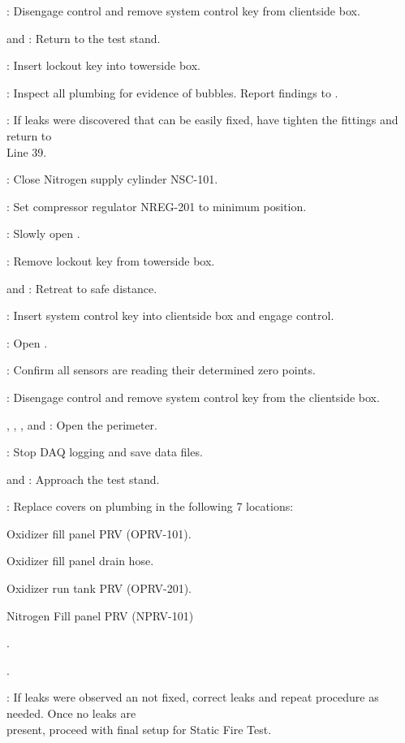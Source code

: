 \begin{checklist}
    \item \rlcs{}: Disengage control and remove system control key from clientside box. 
    \item \primary{} and \secondary{}: Return to the test stand. 
    \item \secondary{}: Insert lockout key into towerside box. 
    \item \primary{}: Inspect all plumbing for evidence of bubbles. Report findings to \ops{}.
    \item \ops{}: If leaks were discovered that can be easily fixed, have \primary{} tighten the fittings and return to \\ \phantom{} \hspace{3ex} Line 39. 
    \item \primary{}: Close Nitrogen supply cylinder NSC-101.
    \item \primary{}: Set compressor regulator NREG-201 to minimum position. 
    \item \primary{}: Slowly open \pdrain{}.
    \item \secondary{}: Remove lockout key from towerside box. 
    \item \primary{} and \secondary{}: Retreat to safe distance. 
    \item \rlcs{}: Insert system control key into clientside box and engage control. 
    \item \rlcs{}: Open \oxfill{}.
    \item \daq{}: Confirm all sensors are reading their determined zero points. 
    \item \rlcs{}: Disengage control and remove system control key from the clientside box.
    \item \peri{}, \perii{}, \periii{}, and \periv{}: Open the perimeter. 
    \item \daq{}: Stop DAQ logging and save data files. 
    \item \primary{} and \secondary{}: Approach the test stand.  
    \item \primary{}: Replace covers on plumbing in the following 7 locations:
    \begin{checklist}
        \item Oxidizer fill panel PRV (OPRV-101).
        \item Oxidizer fill panel drain hose.
        \item Oxidizer run tank PRV (OPRV-201).
        \item Nitrogen Fill panel PRV (NPRV-101)
        \item \vent{}.
        \item \fdrain{}.
        \item \pdrain{}
    \end{checklist}    
    \item \ops{}: If leaks were observed an not fixed, correct leaks and repeat procedure as needed. Once no leaks are \\ \phantom{} \hspace{3ex} present, proceed with final setup for Static Fire Test. 
\end{checklist}
\setcounter{checklistnum}{0}


